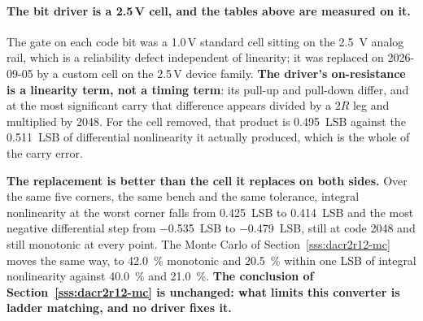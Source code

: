 
\paragraph{The bit driver is a 2.5\,V cell, and the tables above are measured on
it.} The gate on each code bit was a 1.0\,V standard cell sitting on the
\SI{2.5}{\volt} analog rail, which is a reliability defect independent of
linearity; it was replaced on 2026-09-05 by a custom cell on the 2.5\,V device
family. \textbf{The driver's on-resistance is a linearity term, not a timing
term}: its pull-up and pull-down differ, and at the most significant carry that
difference appears divided by a \(2R\) leg and multiplied by \num{2048}. For the
cell removed, that product is \SI{0.495}{LSB} against the \SI{0.511}{LSB} of
differential nonlinearity it actually produced, which is the whole of the carry
error.

\textbf{The replacement is better than the cell it replaces on both sides.} Over
the same five corners, the same bench and the same tolerance, integral
nonlinearity at the worst corner falls from \SI{0.425}{LSB} to \SI{0.414}{LSB}
and the most negative differential step from \SI{-0.535}{LSB} to
\SI{-0.479}{LSB}, still at code \num{2048} and still monotonic at every point.
The Monte Carlo of
Section~\ref{sss:dacr2r12-mc} moves the same way, to \SI{42.0}{\percent}
monotonic and \SI{20.5}{\percent} within one LSB of integral nonlinearity
against \SI{40.0}{\percent} and \SI{21.0}{\percent}. \textbf{The conclusion of
Section~\ref{sss:dacr2r12-mc} is unchanged: what limits this converter is ladder
matching, and no driver fixes it.}
